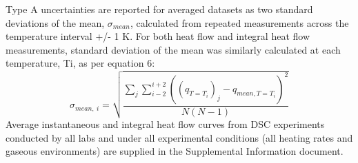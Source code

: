\documentclass{book}
\begin{document}
Type A uncertainties are reported for averaged datasets as two standard deviations of the mean, $\sigma_{mean}$, calculated from repeated measurements across the temperature interval +/- 1 K. For both heat flow and integral heat flow measurements, standard deviation of the mean was similarly calculated at each temperature, Ti, as per equation 6:
\begin{equation}
   \sigma_{mean,\ i}=\sqrt{\frac{\sum_{j}\sum_{i-2}^{i+2}\left(\left(q_{T=T_i}\right)_j-q_{mean,T=T_i}\right)^2}{N\left(N-1\right)}}
\end{equation}
Average instantaneous and integral heat flow curves from DSC experiments conducted by all labs and under all experimental conditions (all heating rates and gaseous environments) are supplied in the Supplemental Information document.
\end{document}
